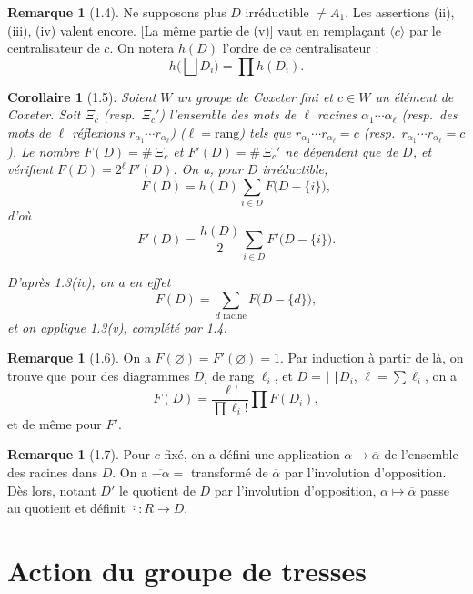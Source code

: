 \documentclass[11pt,a4paper]{article}
\theoremstyle{plain}
\newtheorem{corollary}[theorem]{Corollaire}
\theoremstyle{definition}
\newtheorem{remark}[theorem]{Remarque}
\begin{document}
\newpage

\begin{remark}[1.4]
Ne supposons plus $D$ irr\'eductible $\neq A_1$. Les assertions (ii), (iii), (iv) valent encore. [La m\^eme partie de (v)] vaut en rempla\c{c}ant $\langle c \rangle$ par le centralisateur de $c$. On notera $h(D)$ l'ordre de ce centralisateur :
\[
h\bigl(\textstyle\bigsqcup D_i\bigr) = \prod h(D_i).
\]
\end{remark}

\begin{corollary}[1.5]
Soient $W$ un groupe de Coxeter fini et $c \in W$ un \'el\'ement de Coxeter. Soit $\Xi_c$ (resp.\ $\Xi_c'$) l'ensemble des mots de $\ell$ racines $\alpha_1 \cdots \alpha_\ell$ (resp.\ des mots de $\ell$ r\'eflexions $r_{\alpha_1} \cdots r_{\alpha_\ell}$) ($\ell = \text{rang}$) tels que $r_{\alpha_1} \cdots r_{\alpha_\ell} = c$ (resp.\ $r_{\alpha_1} \cdots r_{\alpha_\ell} = c$). Le nombre $F(D) = \#\,\Xi_c$ et $F'(D) = \#\,\Xi_c'$ ne d\'ependent que de $D$, et v\'erifient $F(D) = 2^\ell\, F'(D)$. On a, pour $D$ irr\'eductible,
\[
F(D) = h(D) \sum_{i \in D} F\bigl(D - \{i\}\bigr),
\]
d'o\`u
\[
F'(D) = \frac{h(D)}{2} \sum_{i \in D} F'\bigl(D - \{i\}\bigr).
\]

D'apr\`es 1.3(iv), on a en effet
\[
F(D) = \sum_{d \text{ racine}} F\bigl(D - \{\overline{d}\}\bigr),
\]
et on applique 1.3(v), compl\'et\'e par 1.4.
\end{corollary}

\begin{remark}[1.6]
On a $F(\varnothing) = F'(\varnothing) = 1$. Par induction \`a partir de l\`a, on trouve que pour des diagrammes $D_i$ de rang $\ell_i$, et $D = \bigsqcup D_i$, $\ell = \sum \ell_i$, on a
\[
F(D) = \frac{\ell!}{\prod \ell_i!} \prod F(D_i),
\]
et de m\^eme pour $F'$.
\end{remark}

\begin{remark}[1.7]
Pour $c$ fix\'e, on a d\'efini une application $\alpha \mapsto \overline{\alpha}$ de l'ensemble des racines dans $D$. On a $\overline{-\alpha} =$ transform\'e de $\overline{\alpha}$ par l'involution d'opposition. D\`es lors, notant $D'$ le quotient de $D$ par l'involution d'opposition, $\alpha \mapsto \overline{\alpha}$ passe au quotient et d\'efinit $\overline{\cdot} : R \to D$.
\end{remark}

\newpage

\section{Action du groupe de tresses}
\end{document}

